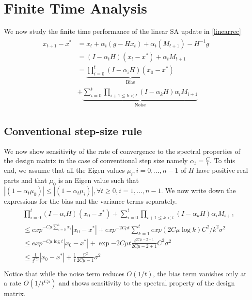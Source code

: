 \section{Finite Time Analysis}
We now study the finite time performance of the linear SA update in \eqref{linearrec}
\begin{align*}
\begin{split}
x_{t+1}-x^*
&=x_t+\alpha_t(g-Hx_t)+\alpha_t(M_{t+1})-H^{-1}g\\
&=(I-\alpha_t H)(x_t-x^*)+\alpha_t M_{t+1}\\
&=\underbrace{\prod_{i=0}^t(I-\alpha_i H)(x_0-x^*)}_{\text{Bias}}\\&+\underbrace{\sum_{i=0}^t \prod_{i+1\leq k<t} (I-\alpha_{k}H)\alpha_i M_{i+1}}_{\text{Noise}}
\end{split}
\end{align*}
\subsection{Conventional step-size rule}
We now show sensitivity of the rate of convergence to the spectral properties of the design matrix in the case of conventional step size namely $\alpha_t=\frac{C}{t}$. To this end, we assume that all the Eigen values $\mu_i, i=0,\ldots,n-1$ of $H$ have positive real parts and that $\mu_0$ is an Eigen value such that $|(1-\alpha_t\mu_0)|\leq |(1-\alpha_t\mu_i)|,\forall t\geq 0, i=1,\ldots,n-1$. We now write down the expressions for the bias and the variance terms separately.
\begin{align}
\begin{split}
&\prod_{i=0}^t(I-\alpha_i H)(x_0-x^*)+\sum_{i=0}^t \prod_{i+1\leq k<t} (I-\alpha_{k}H)\alpha_i M_{i+1}\\
&\leq exp^{-C\mu\sum_{i=0}^t\alpha_i}|x_0-x^*|+exp^{-2C\mu t}\sum_{k=1}^t exp(2C\mu\log k)C^2/k^2 \sigma^2\\
&\leq exp^{-C\mu\log t}|x_0-x^*|+\exp{-2C\mu t} \frac{t^{2C\mu-2+1}}{2C\mu-2+1}C^2\sigma^2\\
&\leq  \frac{1}{t^{C\mu}}|x_0-x^*|+\frac{1}{t}\frac{C^2}{2C\mu-1}\sigma^2\\
\end{split}
\end{align}
Notice that while the noise term reduces $O(1/t)$, the bias term vanishes only at a rate $O(1/t^{C\mu})$ and shows sensitivity to the spectral property of the design matrix.
